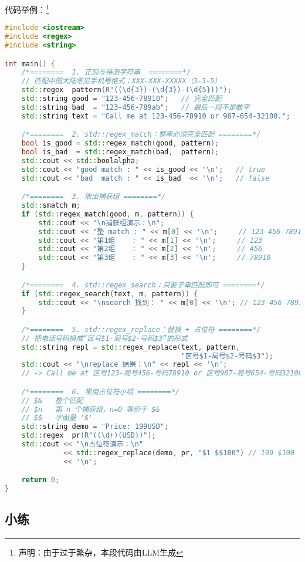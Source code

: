 代码举例：\footnote{声明：由于过于繁杂，本段代码由LLM生成}
\begin{lstlisting}[language=C++]
#include <iostream>
#include <regex>
#include <string>

int main() {
    /*========  1. 正则与待测字符串  ========*/
    // 匹配中国大陆常见手机号格式：XXX-XXX-XXXXX（3-3-5）
    std::regex  pattern(R"((\d{3})-(\d{3})-(\d{5}))");
    std::string good = "123-456-78910";   // 完全匹配
    std::string bad  = "123-456-789ab";   // 最后一段不是数字
    std::string text = "Call me at 123-456-78910 or 987-654-32100.";

    /*========  2. std::regex_match：整串必须完全匹配 ========*/
    bool is_good = std::regex_match(good, pattern);
    bool is_bad  = std::regex_match(bad,  pattern);
    std::cout << std::boolalpha;
    std::cout << "good match : " << is_good << '\n';   // true
    std::cout << "bad  match : " << is_bad  << '\n';   // false

    /*========  3. 取出捕获组 ========*/
    std::smatch m;
    if (std::regex_match(good, m, pattern)) {
        std::cout << "\n捕获组演示：\n";
        std::cout << "整 match : " << m[0] << '\n';     // 123-456-78910
        std::cout << "第1组    : " << m[1] << '\n';     // 123
        std::cout << "第2组    : " << m[2] << '\n';     // 456
        std::cout << "第3组    : " << m[3] << '\n';     // 78910
    }

    /*========  4. std::regex_search：只要子串匹配即可 ========*/
    if (std::regex_search(text, m, pattern)) {
        std::cout << "\nsearch 找到： " << m[0] << '\n'; // 123-456-78910
    }

    /*========  5. std::regex_replace：替换 + 占位符 ========*/
    // 把电话号码换成“区号$1-局号$2-号码$3”的形式
    std::string repl = std::regex_replace(text, pattern,
                                          "区号$1-局号$2-号码$3");
    std::cout << "\nreplace 结果：\n" << repl << '\n';
    // -> Call me at 区号123-局号456-号码78910 or 区号987-局号654-号码32100.

    /*========  6. 常用占位符小结 ========*/
    // $&   整个匹配
    // $n   第 n 个捕获组，n=0 等价于 $&
    // $$   字面量 '$'
    std::string demo = "Price: 199USD";
    std::regex  pr(R"((\d+)(USD))");
    std::cout << "\n占位符演示：\n"
              << std::regex_replace(demo, pr, "$1 $$100") // 199 $100
              << '\n';

    return 0;
}
\end{lstlisting}

\subsection{小练}

